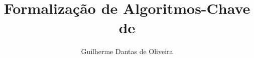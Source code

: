 \documentclass[msc,american]{thesispuc}%
\author{Guilherme Dantas de Oliveira}
\title{Formalização de Algoritmos-Chave de \lpeg{}} %
\begin{document}
    
    
    
    
    
    
    \arial
    
\end{document}
